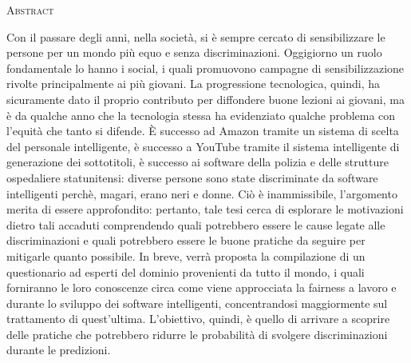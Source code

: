 
\begin{center}
    \LARGE \textsc{Abstract}
\end{center}


Con il passare degli anni, nella società, si è sempre cercato di sensibilizzare le persone per un mondo più equo e senza discriminazioni. Oggigiorno un ruolo fondamentale lo hanno i social, i quali promuovono campagne di sensibilizzazione rivolte principalmente ai più giovani. La progressione tecnologica, quindi, ha sicuramente dato il proprio contributo per diffondere buone lezioni ai giovani, ma è da qualche anno che la tecnologia stessa ha evidenziato qualche problema con l'equità che tanto si difende. È successo ad Amazon tramite un sistema di scelta del personale intelligente, è successo a YouTube tramite il sistema intelligente di generazione dei sottotitoli, è successo ai software della polizia e delle strutture ospedaliere statunitensi: diverse persone sono state discriminate da software intelligenti perchè, magari, erano neri e donne. Ciò è inammissibile, l'argomento merita di essere approfondito: pertanto, tale tesi cerca di esplorare le motivazioni dietro tali accaduti comprendendo quali potrebbero essere le cause legate alle discriminazioni e quali potrebbero essere le buone pratiche da seguire per mitigarle quanto possibile. In breve, verrà proposta la compilazione di un questionario ad esperti del dominio provenienti da tutto il mondo, i quali forniranno le loro conoscenze circa come viene approcciata la fairness a lavoro e durante lo sviluppo dei software intelligenti, concentrandosi maggiormente sul trattamento di quest'ultima. L'obiettivo, quindi, è quello di arrivare a scoprire delle pratiche che potrebbero ridurre le probabilità di svolgere discriminazioni durante le predizioni.

